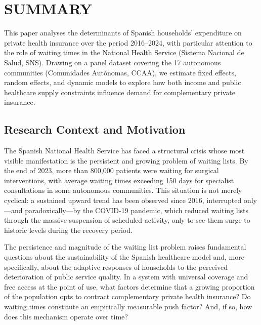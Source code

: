 \documentclass[12pt, a4paper, twoside]{report}
\begin{document}
\printbibliography[heading=bibintoc, title={Bibliografía}]

\chapter*{SUMMARY}

This paper analyses the determinants of Spanish households' expenditure on private health insurance over the period 2016--2024, with particular attention to the role of waiting times in the National Health Service (Sistema Nacional de Salud, SNS). Drawing on a panel dataset covering the 17 autonomous communities (Comunidades Autónomas, CCAA), we estimate fixed effects, random effects, and dynamic models to explore how both income and public healthcare supply constraints influence demand for complementary private insurance.

\section*{Research Context and Motivation}

The Spanish National Health Service has faced a structural crisis whose most visible manifestation is the persistent and growing problem of waiting lists. By the end of 2023, more than 800,000 patients were waiting for surgical interventions, with average waiting times exceeding 150 days for specialist consultations in some autonomous communities. This situation is not merely cyclical: a sustained upward trend has been observed since 2016, interrupted only---and paradoxically---by the COVID-19 pandemic, which reduced waiting lists through the massive suspension of scheduled activity, only to see them surge to historic levels during the recovery period.

The persistence and magnitude of the waiting list problem raises fundamental questions about the sustainability of the Spanish healthcare model and, more specifically, about the adaptive responses of households to the perceived deterioration of public service quality. In a system with universal coverage and free access at the point of use, what factors determine that a growing proportion of the population opts to contract complementary private health insurance? Do waiting times constitute an empirically measurable push factor? And, if so, how does this mechanism operate over time?
\end{document}
